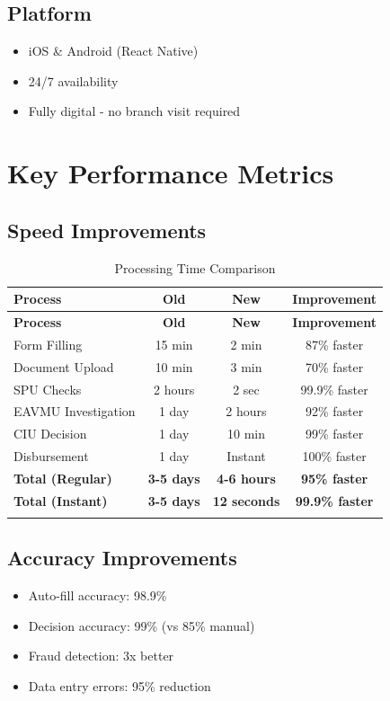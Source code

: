 \documentclass[11pt,a4paper]{article}
\begin{document}
\subsection{Platform}
\begin{itemize}[leftmargin=*]
    \item iOS \& Android (React Native)
    \item 24/7 availability
    \item Fully digital - no branch visit required
\end{itemize}

\newpage

\section{Key Performance Metrics}

\subsection{Speed Improvements}

\begin{longtable}{@{}lccc@{}}
\toprule
\textbf{Process} & \textbf{Old} & \textbf{New} & \textbf{Improvement} \\ \midrule
\endfirsthead
\toprule
\textbf{Process} & \textbf{Old} & \textbf{New} & \textbf{Improvement} \\ \midrule
\endhead
Form Filling & 15 min & 2 min & 87\% faster \\
Document Upload & 10 min & 3 min & 70\% faster \\
SPU Checks & 2 hours & 2 sec & 99.9\% faster \\
EAVMU Investigation & 1 day & 2 hours & 92\% faster \\
CIU Decision & 1 day & 10 min & 99\% faster \\
Disbursement & 1 day & Instant & 100\% faster \\ \midrule
\textbf{Total (Regular)} & \textbf{3-5 days} & \textbf{4-6 hours} & \textbf{95\% faster} \\
\textbf{Total (Instant)} & \textbf{3-5 days} & \textbf{12 seconds} & \textbf{99.9\% faster} \\
\bottomrule
\caption{Processing Time Comparison}
\end{longtable}

\subsection{Accuracy Improvements}
\begin{itemize}[leftmargin=*]
    \item Auto-fill accuracy: 98.9\%
    \item Decision accuracy: 99\% (vs 85\% manual)
    \item Fraud detection: 3x better
    \item Data entry errors: 95\% reduction
\end{itemize}
\end{document}
